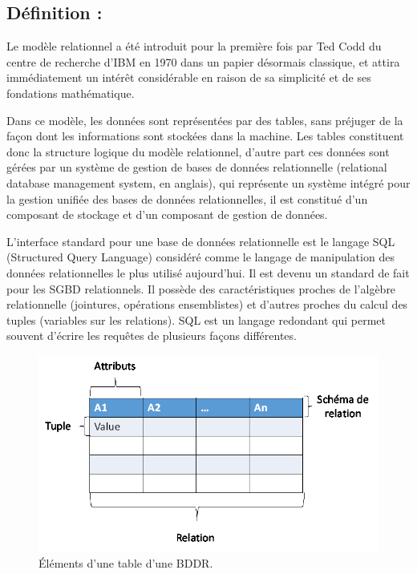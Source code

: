 \subsection{Définition : }
Le modèle relationnel a été introduit pour la première fois par Ted Codd du centre de recherche d’IBM en 1970 dans un papier désormais classique, et attira immédiatement un intérêt considérable en raison de sa simplicité et de ses fondations mathématique.

Dans ce modèle, les données sont représentées par des tables, sans préjuger de la façon dont les informations sont stockées dans la machine. Les tables constituent donc la structure logique du modèle relationnel, d’autre part ces données sont gérées par un système de gestion de bases de données relationnelle (relational database management system, en anglais), qui représente un système intégré pour la gestion unifiée des bases de données relationnelles, il est constitué d’un composant de stockage et d’un composant de gestion de données.

L’interface standard pour une base de données relationnelle est le langage SQL (Structured Query Language) considéré comme le langage de manipulation des données relationnelles le plus utilisé aujourd’hui. Il est devenu un standard de fait pour les SGBD relationnels. Il possède des caractéristiques proches de l’algèbre relationnelle (jointures, opérations ensemblistes) et d’autres proches du calcul des tuples (variables sur les relations). SQL est un langage redondant qui permet souvent d'écrire les requêtes de plusieurs façons différentes.

\begin{figure}[h]
	\centering
    \includegraphics[scale=0.5]{img/4.0.1}
    \caption{Éléments d'une table d'une BDDR.}
\end{figure}